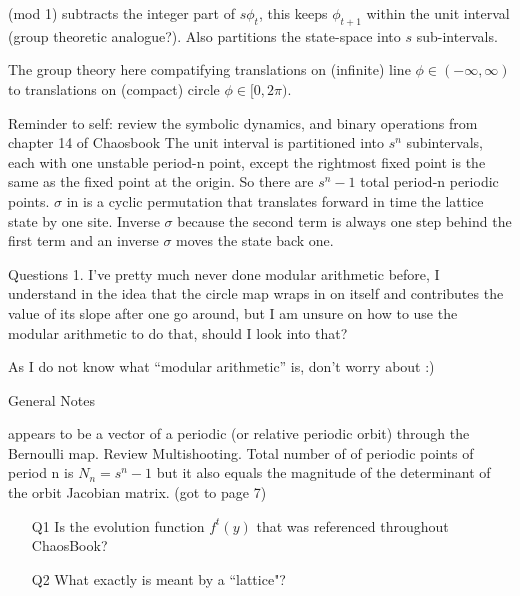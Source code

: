 \begin{description}
(mod 1) subtracts the integer part of $s\phi_t$, this keeps $\phi_{t+1}$
within the unit interval (group theoretic analogue?). Also partitions
the state-space into $s$ sub-intervals.

\item[2020-08-24 Predrag]
The group theory here compatifying translations on (infinite) line
$\phi\in(-\infty,\infty)$ to translations on (compact) circle
$\phi\in[0,2\pi)$.

\item[2020-08-24 Sidney]
Reminder to self: review the symbolic dynamics, and binary operations from chapter 14 of Chaosbook
The unit interval is partitioned into $s^n$ subintervals, each with one unstable period-n point, except the rightmost fixed point is the same as the fixed point at the origin. So there are $s^n-1$ total period-n periodic points.
$\sigma$ in  is a cyclic permutation that translates forward in time the lattice state by one site. Inverse $\sigma$ because the second term is always one step behind the first term and an inverse $\sigma$ moves the state back one.
\vspace{3mm}

Questions
1. I've pretty much never done modular arithmetic before, I understand  in the idea that the circle map wraps in on itself and contributes the value of its slope after one go around, but I am unsure on how to use the modular arithmetic to do that, should I look into that?

\item[2020-08-24 Predrag]
As I do not know what ``modular arithmetic'' is, don't worry about :)

\item[2020-08-25 Sidney]
General Notes

 appears to be a vector of a periodic (or relative periodic orbit) through the Bernoulli map. Review Multishooting. Total number of of periodic points of period n is $N_n=s^n-1$ but it also equals the magnitude of the determinant of the orbit Jacobian matrix. (got to page 7)

\vspace{3mm}

\begin{itemize}
  \item[Q1]
Is  the evolution function $f^t(y)$ that was
referenced throughout ChaosBook?
  \item[Q2]
What exactly is meant by a ``lattice"?
\end{itemize}


\end{description}
